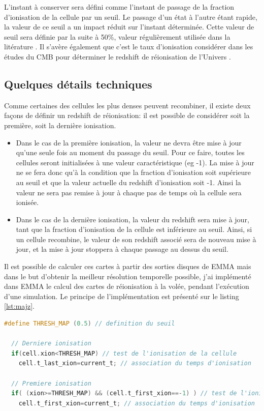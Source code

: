 L'instant à conserver sera défini comme l'instant de passage de la fraction d'ionisation de la cellule par un seuil.
Le passage d'un état à l'autre étant rapide, la valeur de ce seuil a un impact réduit sur l'instant déterminée.
Cette valeur de seuil sera définie par la suite à 50\%, valeur régulièrement utilisée dans la litérature \citep{iliev_cosmological_2006, doi:10.1111/j.1365-2966.2011.18219.x, 2012A&A...548A...9C}.
Il s'avère également que c'est le taux d'ionisation considérer dans les études du \ac{CMB} pour déterminer le redshift de réionisation de l'Univers \citep{planck_collaboration_planck_2016}.

\subsection{Quelques détails techniques}
Comme certaines des cellules les plus denses peuvent recombiner, il existe deux façons de définir un redshift de réionisation: il est possible de considérer soit la première, soit la dernière ionisation.

\begin{itemize}
\item Dans le cas de la première ionisation, la valeur ne devra être mise à jour qu'une seule fois au moment du passage du seuil.
Pour ce faire, toutes les cellules seront initialisées à une valeur caractéristique (eg -1).
La mise à jour ne se fera donc qu'à la condition que la fraction d'ionisation soit supérieure au seuil et que la valeur actuelle du redshift d'ionisation soit -1.
Ainsi la valeur ne sera pas remise à jour à chaque pas de temps où la cellule sera ionisée. 

\item Dans le cas de la dernière ionisation, la valeur du redshift sera mise à jour, tant que la fraction d'ionisation de la cellule est inférieure au seuil.
Ainsi, si un cellule recombine, le valeur de son redshift associé sera de nouveau mise à jour, et la mise à jour stoppera à chaque passage au dessus du seuil.
\end{itemize}

Il est possible de calculer ces cartes à partir des sorties disques de EMMA mais dans le but d'obtenir la meilleur résolution temporelle possible, j'ai implémenté dans EMMA le calcul des cartes de réionisation à la volée, pendant l'exécution d'une simulation.
Le principe de l'implémentation est présenté sur le listing \ref{lst:majz}.

\begin{lstlisting}[float=bth,language=c,frame=tb,caption={Mise a jour du redshift de reionisation},label=lst:majz]
  #define THRESH_MAP (0.5) // definition du seuil

  // Derniere ionisation 
  if(cell.xion<THRESH_MAP) // test de l'ionisation de la cellule
    cell.t_last_xion=current_t; // association du temps d'ionisation 

  // Premiere ionisation 
  if( (xion>=THRESH_MAP) && (cell.t_first_xion==-1) ) // test de l'ionisation de la cellule et de premiere ionisation
    cell.t_first_xion=current_t; // association du temps d'ionisation 
\end{lstlisting}

